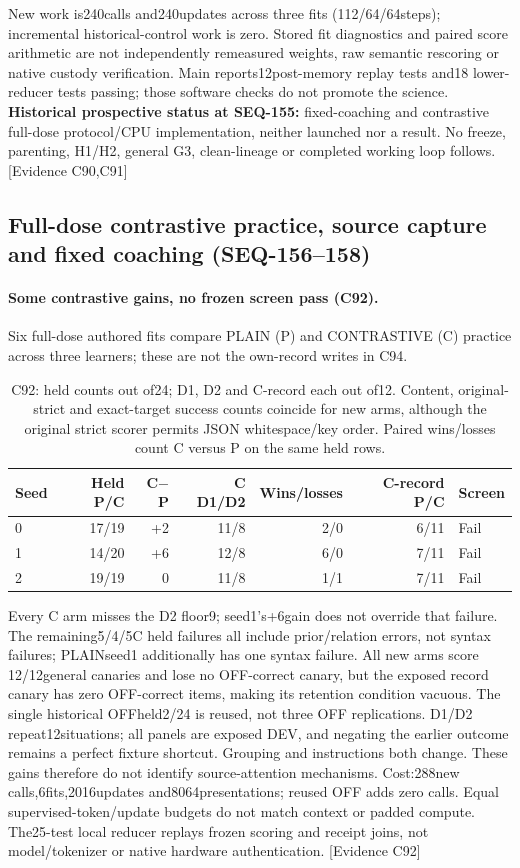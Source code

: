 \documentclass[11pt]{article}
\newcommand{\ev}[1]{\textsf{[Evidence #1]}}
\begin{document}
New work is240calls and240updates across three fits (112/64/64steps);
incremental historical-control work is zero. Stored fit diagnostics and paired
score arithmetic are not independently remeasured weights, raw semantic rescoring
or native custody verification. Main reports12post-memory replay tests and18
lower-reducer tests passing; those software checks do not promote the science.
\textbf{Historical prospective status at SEQ-155:} fixed-coaching and contrastive full-dose
protocol/CPU implementation, neither launched nor a result. No freeze, parenting,
H1/H2, general G3, clean-lineage or completed working loop follows. \ev{C90,C91}


\subsection{Full-dose contrastive practice, source capture and fixed coaching (SEQ-156--158)}
\label{sec:seq158-extension}

\paragraph{Some contrastive gains, no frozen screen pass (C92).}
Six full-dose authored fits compare PLAIN (P) and CONTRASTIVE (C) practice
across three learners; these are not the own-record writes in C94.
\begin{table}[htbp]
\centering\small
\begin{tabular}{lrrrrrl}
\toprule
Seed & Held P/C & C$-$P & C D1/D2 & Wins/losses & C-record P/C & Screen \\
\midrule
0 & 17/19 & +2 & 11/8 & 2/0 & 6/11 & Fail \\
1 & 14/20 & +6 & 12/8 & 6/0 & 7/11 & Fail \\
2 & 19/19 & 0 & 11/8 & 1/1 & 7/11 & Fail \\
\bottomrule
\end{tabular}
\caption{C92: held counts out of24; D1, D2 and C-record each out of12.
Content, original-strict and exact-target success counts coincide for new arms,
although the original strict scorer permits JSON whitespace/key order.
Paired wins/losses count C versus P on the same held rows.}
\label{tab:seq156-contrastive}
\end{table}
Every C arm misses the D2 floor9; seed1's+6gain does not override that failure.
The remaining5/4/5C held failures all include prior/relation errors, not syntax
failures; PLAINseed1 additionally has one syntax failure. All new arms score
12/12general canaries and lose no OFF-correct canary, but the exposed record
canary has zero OFF-correct items, making its retention condition vacuous.
The single historical OFFheld2/24 is reused, not three OFF replications.
D1/D2 repeat12situations; all panels are exposed DEV, and negating the earlier
outcome remains a perfect fixture shortcut. Grouping and instructions both
change. These gains therefore do not identify source-attention mechanisms.
Cost:288new calls,6fits,2016updates and8064presentations; reused OFF adds zero
calls. Equal supervised-token/update budgets do not match context or padded
compute. The25-test local reducer replays frozen scoring and receipt joins,
not model/tokenizer or native hardware authentication. \ev{C92}
\end{document}
